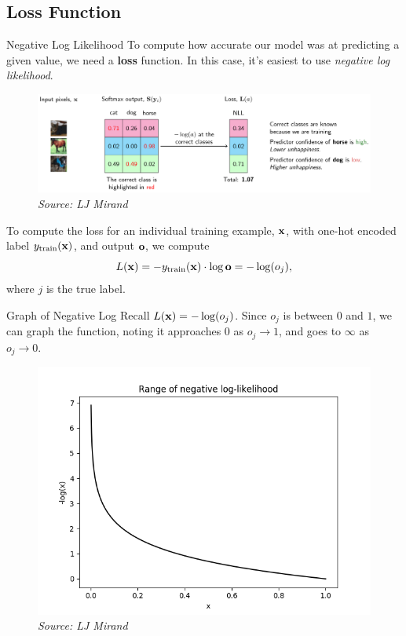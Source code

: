 \documentclass[xcolor=dvipsnames, fontsize=11pt, %
pagesize, %
parskip=half-, t]{beamer}
\begin{document}
 \subsection{Loss Function}
 \begin{frame}{Negative Log Likelihood}
 To compute how accurate our model was at predicting a given value, we need a \textbf{loss} function. In this case, it's easiest to use \textit{negative log likelihood}.  \pause
 \begin{figure}[H] \center \includegraphics[scale=0.15]{neg_log_demo.png}
 \caption{\textit{Source: LJ Mirand}} \end{figure} \pause 
To compute the loss for an individual training example, $\bold{x}$, with one-hot encoded label $y_{\text{train}}(\bold{x})$, and output $\bold{o}$, we compute $$L(\bold{x})=-y_{\text{train}}(\bold{x})\cdot \log \bold{o}=-\log(o_j),$$ where $j$ is the true label.
 \end{frame}
 \begin{frame}{Graph of Negative Log}
Recall $L(\bold{x})=-\log(o_j)$. Since $o_j$ is between $0$ and $1$, we can graph the function, noting it approaches $0$ as $o_j\to 1$, and goes to $\infty$ as $o_j\to 0$.
\begin{figure}[H] \center \includegraphics[scale=0.45]{neg_log.png}
\caption{\textit{Source:  LJ Mirand}}\end{figure}
 \end{frame}
\end{document}
